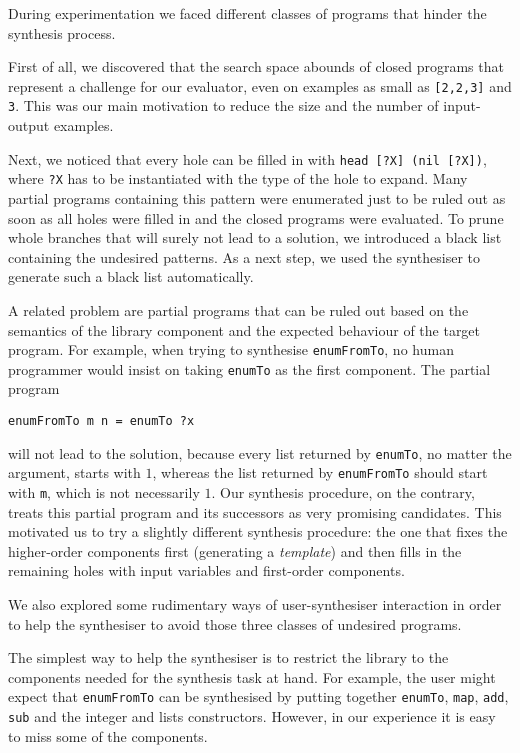 During experimentation we faced different classes of programs that hinder the synthesis process.

First of all, we discovered that the search space abounds of closed programs that represent a challenge for our evaluator, even on examples as small as \lstinline![2,2,3]! and \lstinline!3!. This was our main motivation to reduce the size and the number of input-output examples.

Next, we noticed that every hole can be filled in with \lstinline!head [?X] (nil [?X])!, where \lstinline!?X! has to be instantiated with the type of the hole to expand. Many partial programs containing this pattern were enumerated just to be ruled out as soon as all holes were filled in and the closed programs were evaluated. To prune whole branches that will surely not lead to a solution, we introduced a black list containing the undesired patterns. As a next step, we used the synthesiser to generate such a black list automatically.

A related problem are partial programs that can be ruled out based on the semantics of the library component and the expected behaviour of the target program. For example, when trying to synthesise \lstinline!enumFromTo!, no human programmer would insist on taking \lstinline!enumTo! as the first component. The partial program
\begin{lstlisting}[style=plain]
enumFromTo m n = enumTo ?x
\end{lstlisting}
will not lead to the solution, because every list returned by \lstinline!enumTo!, no matter the argument, starts with $1$, whereas the list returned by \lstinline!enumFromTo! should start with \lstinline!m!, which is not necessarily $1$. Our synthesis procedure, on the contrary, treats this partial program and its successors as very promising candidates.
This motivated us to try a slightly different synthesis procedure: the one that fixes the higher-order components first (generating a \emph{template}) and then fills in the remaining holes with input variables and first-order components.

We also explored some rudimentary ways of user-synthesiser interaction in order to help the synthesiser to avoid those three classes of undesired programs.

The simplest way to help the synthesiser is to restrict the library to the components needed for the synthesis task at hand. For example, the user might expect that \lstinline!enumFromTo! can be synthesised by putting together \lstinline!enumTo!, \lstinline!map!, \lstinline!add!, \lstinline!sub! and the integer and lists constructors. However, in our experience it is easy to miss some of the components.

